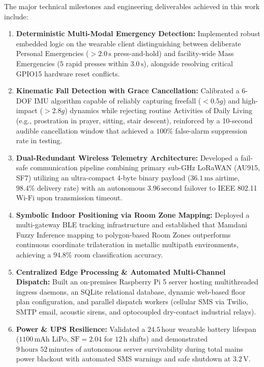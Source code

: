 The major technical milestones and engineering deliverables achieved in this work include:
\begin{enumerate}
    \item \textbf{Deterministic Multi-Modal Emergency Detection:} Implemented robust embedded logic on the wearable client distinguishing between deliberate Personal Emergencies ($>2.0\,\text{s}$ press-and-hold) and facility-wide Mass Emergencies ($5$ rapid presses within $3.0\,\text{s}$), alongside resolving critical GPIO15 hardware reset conflicts.
    \item \textbf{Kinematic Fall Detection with Grace Cancellation:} Calibrated a 6-DOF IMU algorithm capable of reliably capturing freefall ($<0.5g$) and high-impact ($>2.8g$) dynamics while rejecting routine Activities of Daily Living (e.g., prostration in prayer, sitting, stair descent), reinforced by a 10-second audible cancellation window that achieved a $100\%$ false-alarm suppression rate in testing.
    \item \textbf{Dual-Redundant Wireless Telemetry Architecture:} Developed a fail-safe communication pipeline combining primary sub-GHz LoRaWAN (AU915, SF7) utilizing an ultra-compact 4-byte binary payload ($36.1\,\text{ms}$ airtime, $98.4\%$ delivery rate) with an autonomous $3.96\,\text{second}$ failover to IEEE 802.11 Wi-Fi upon transmission timeout.
    \item \textbf{Symbolic Indoor Positioning via Room Zone Mapping:} Deployed a multi-gateway BLE tracking infrastructure and established that Mamdani Fuzzy Inference mapping to polygon-based Room Zones outperforms continuous coordinate trilateration in metallic multipath environments, achieving a $94.8\%$ room classification accuracy.
    \item \textbf{Centralized Edge Processing & Automated Multi-Channel Dispatch:} Built an on-premises Raspberry Pi 5 server hosting multithreaded ingress daemons, an SQLite relational database, dynamic web-based floor plan configuration, and parallel dispatch workers (cellular SMS via Twilio, SMTP email, acoustic sirens, and optocoupled dry-contact industrial relays).
    \item \textbf{Power & UPS Resilience:} Validated a $24.5\,\text{hour}$ wearable battery lifespan ($1100\,\text{mAh}$ LiPo, $\text{SF} = 2.04$ for $12\,\text{h}$ shifts) and demonstrated $9\,\text{hours } 52\,\text{minutes}$ of autonomous server survivability during total mains power blackout with automated SMS warnings and safe shutdown at $3.2\,\text{V}$.
\end{enumerate}

